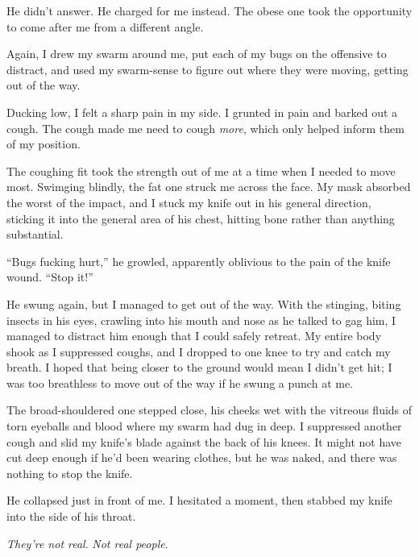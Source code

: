 He didn't answer.  He charged for me instead.  The obese one took the opportunity to come after me from a different angle.



Again, I drew my swarm around me, put each of my bugs on the offensive to distract, and used my swarm-sense to figure out where they were moving, getting out of the way.



Ducking low, I felt a sharp pain in my side.  I grunted in pain and barked out a cough.  The cough made me need to cough \emph{more}, which only helped inform them of my position.



The coughing fit took the strength out of me at a time when I needed to move most.  Swimging blindly, the fat one struck me across the face.  My mask absorbed the worst of the impact, and I stuck my knife out in his general direction, sticking it into the general area of his chest, hitting bone rather than anything substantial.



``Bugs fucking hurt,'' he growled, apparently oblivious to the pain of the knife wound.  ``Stop it!''



He swung again, but I managed to get out of the way.  With the stinging, biting insects in his eyes, crawling into his mouth and nose as he talked to gag him, I managed to distract him enough that I could safely retreat.  My entire body shook as I suppressed coughs, and I dropped to one knee to try and catch my breath.  I hoped that being closer to the ground would mean I didn't get hit; I was too breathless to move out of the way if he swung a punch at me.



The broad-shouldered one stepped close, his cheeks wet with the vitreous fluids of torn eyeballs and blood where my swarm had dug in deep.  I suppressed another cough and slid my knife's blade against the back of his knees.  It might not have cut deep enough if he'd been wearing clothes, but he was naked, and there was nothing to stop the knife.



He collapsed just in front of me.  I hesitated a moment, then stabbed my knife into the side of his throat.



\emph{They're not real}.  \emph{Not real people}.



